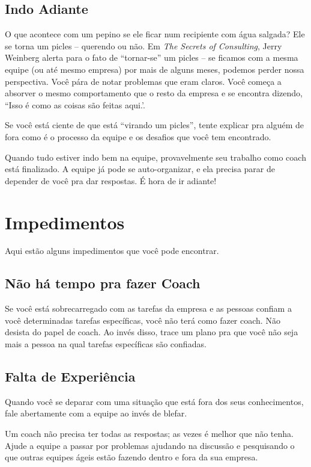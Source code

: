 \documentclass[a4paper, 10pt, font=plain]{abnt}
\begin{document}
\subsection{Indo Adiante}
O que acontece com um pepino se ele ficar num recipiente com água salgada? Ele se torna um picles -- querendo ou não. Em \textit{The Secrets of Consulting}, Jerry Weinberg alerta para o fato de ``tornar-se'' um picles -- se ficamos com a mesma equipe (ou até mesmo empresa) por mais de alguns meses, podemos perder nossa perspectiva. Você pára de notar problemas que eram claros. Você começa a absorver o mesmo comportamento que o resto da empresa e se encontra dizendo, ``Isso é como as coisas são feitas aqui.'.

Se você está ciente de que está ``virando um picles'', tente explicar pra alguém de fora como é o processo da equipe e os desafios que você tem encontrado.

Quando tudo estiver indo bem na equipe, provavelmente seu trabalho como coach está finalizado. A equipe já pode se auto-organizar, e ela precisa parar de depender de você pra dar respostas. É hora de ir adiante!


\section{Impedimentos}
Aqui estão alguns impedimentos que você pode encontrar.

\subsection{Não há tempo pra fazer Coach}
Se você está sobrecarregado com as tarefas da empresa e as pessoas confiam a você determinadas tarefas específicas, você não terá como fazer coach. Não desista do papel de coach. Ao invés disso, trace um plano pra que você não seja mais a pessoa na qual tarefas específicas são confiadas.

\subsection{Falta de Experiência}
Quando você se deparar com uma situação que está fora dos seus conhecimentos, fale abertamente com a equipe ao invés de blefar.

Um coach não precisa ter todas as respostas; as vezes é melhor que não tenha. Ajude a equipe a passar por problemas ajudando na discussão e pesquisando o que outras equipes ágeis estão fazendo dentro e fora da sua empresa.
\end{document}
